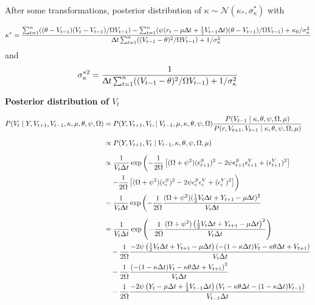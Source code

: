 \documentclass[12pt,a4paper]{article}
\numberwithin{equation}{section}
\begin{document}
After some transformations, posterior distribution of $\kappa \sim \mathcal{N}(\kappa_*, \sigma_\kappa^*)$ with

\[
\kappa^* = \frac{\sum_{t=1}^n ((\theta - V_{t-1}) (V_t - V_{t-1})/\Omega V_{t-1}) - \sum_{t=1}^n (\psi (r_t - \mu \Updelta t + \frac{1}{2} V_{t-1} \Updelta t )(\theta - V_{t-1})/\Omega V_{t-1}) + \kappa_0/\sigma_\kappa^2}{\Updelta t \sum_{t=1}^n ((V_{t-1}-\theta)^2/\Omega V_{t-1}) + 1 / \sigma_\kappa^2}
\]
and
\[
\sigma_\kappa^{*2} = \frac{1}{\Updelta t \sum_{t=1}^n ((V_{t-1}-\theta)^2/\Omega V_{t-1}) + 1 / \sigma_\kappa^2}
\]

\vspace{1em}

\textbf{Posterior distribution of $V_t$}
\vspace{1em}

\begin{align*}
P(V_t \mid Y, V_{t+1}, V_{t-1}, \kappa, \mu, \theta, \psi, \Omega) &= P(Y, V_{t+1}, V_{t}, \mid V_{t-1}, \mu, \kappa, \theta, \psi, \Omega) \frac{P(V_{t-1} \mid \kappa, \theta, \psi, \Omega, \mu)}{P(r, V_{t+1}, V_{t-1} \mid \kappa, \theta, \psi, \Omega, \mu)}\\[0.6em]
& \propto P(Y, V_{t+1}, V_{t} \mid V_{t-1}, \kappa, \theta, \psi, \Omega, \mu)\\[0.6em]
&\propto \frac{1}{V_t\Delta t}\exp\left(-\frac{1}{2\Omega}\left[(\Omega+\psi^2)(\epsilon_{t+1}^S)^2 - 2\psi\epsilon_{t+1}^S\epsilon_{t+1}^V + (\epsilon_{t+1}^V)^2\right]\right. \\
&\quad \left. -\frac{1}{2\Omega}\left[(\Omega+\psi^2)(\epsilon_i^S)^2 - 2\psi\epsilon_i^S\epsilon_i^V + (\epsilon_i^V)^2\right]\right)\\
&=\frac{1}{V_t \Updelta t}\exp\left(-\frac{1}{2 \Omega} \frac{(\Omega + \psi^2)(\frac{1}{2}V_t \Updelta t + Y_{t+1} - \mu \Updelta t)^2}{V_t \Updelta t} \right. \\[0.6em] 
&= \frac{1}{V_t \Delta t} \exp \left( - \frac{1}{2 \Omega} \frac{(\Omega + \psi^2)\left(\frac{1}{2} V_t \Delta t + Y_{t+1} - \mu \Delta t\right)^2}{V_t \Delta t} \right) \\
&\quad - \frac{1}{2 \Omega} \frac{- 2 \psi \left(\frac{1}{2} V_t \Delta t + Y_{t+1} - \mu \Delta t\right) \left(- (1 - \kappa \Delta t) V_t - \kappa \theta \Delta t + V_{t+1}\right)}{V_t \Delta t} \\
&\quad - \frac{1}{2 \Omega} \frac{\left(- (1 - \kappa \Delta t) V_t - \kappa \theta \Delta t + V_{t+1}\right)^2}{V_t \Delta t} \\
&\quad - \frac{1}{2 \Omega} \frac{- 2 \psi \left(Y_t - \mu \Delta t + \frac{1}{2} V_{t-1} \Delta t\right) \left(V_t - \kappa \theta \Delta t - (1 - \kappa \Delta t) V_{t-1}\right)}{V_{t-1} \Delta t} \\

\end{align*}
\end{document}
